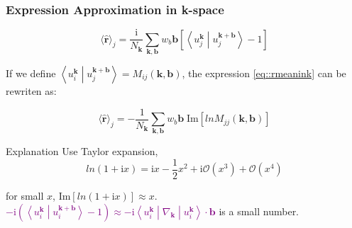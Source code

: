 \documentclass{beamer}
\begin{document}
  \begin{frame}
    \frametitle{Expression Approximation in k-space}
    \small
    \begin{equation*}
      \langle\widehat{\mathbf{r}}\rangle_j = \dfrac{\mathrm{i}}{N_\mathbf{k}}\sum_{\mathbf{k},\mathbf{b}}w_b\mathbf{b}\left[\left\langle{}u_j^{\mathbf{k}}\middle|u_j^{\mathbf{k}+\mathbf{b}}\right\rangle-1\right]
    \end{equation*}

    If we define \(\left\langle{}u_i^{\mathbf{k}}\middle|u_j^{\mathbf{k}+\mathbf{b}}\right\rangle = M_{ij}(\mathbf{k}, \mathbf{b})\), the expression \eqref{eq::rmeanink} can be rewriten as:
     
    \begin{equation}
        \langle\widehat{\mathbf{r}}\rangle_j = -\dfrac{1}{N_\mathbf{k}}\sum_{\mathbf{k},\mathbf{b}}w_b\mathbf{b}\;\mathrm{Im}[lnM_{jj}(\mathbf{k}, \mathbf{b})]
    \end{equation}

    \begin{block}{Explanation}
      Use Taylor expansion, 
      \begin{equation*}
        ln(1+\mathrm{i}x) = \mathrm{i}x - \frac{1}{2}x^2 + \mathrm{i}\mathcal{O}(x^3) + \mathcal{O}(x^4)
      \end{equation*}

      for small \(x\), \(\mathrm{Im}[ln(1+\mathrm{i}x)] \approx x\).\\[4pt]
      
      \textcolor{purple}{\(-\mathrm{i}\left(\left\langle{}u_i^{\mathbf{k}}\middle|u_i^{\mathbf{k}+\mathbf{b}}\right\rangle-1\right) \approx -\mathrm{i}\left\langle{}u_i^{\mathbf{k}}\middle|\nabla_{\mathbf{k}}\middle|u_i^{\mathbf{k}}\right\rangle\cdot\mathbf{b}\)} is a small number. 
    \end{block}

  \end{frame}
\end{document}
